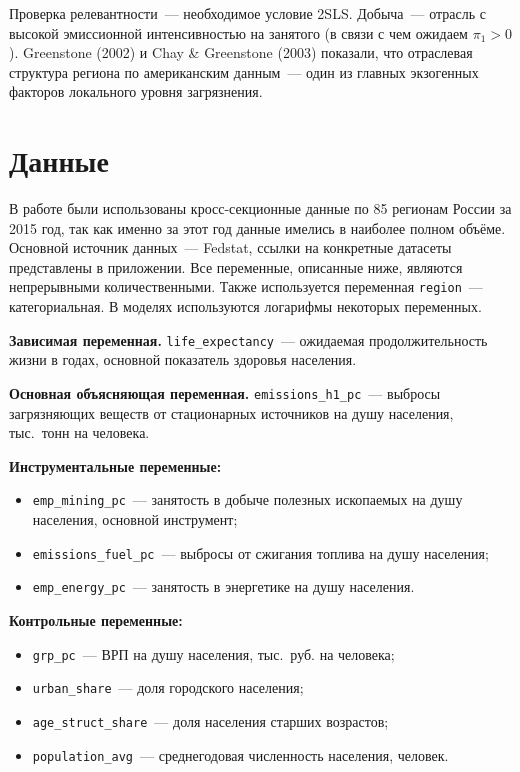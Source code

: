 \documentclass[11pt,a4paper]{article}
\begin{document}
Проверка релевантности~--- необходимое условие 2SLS. Добыча~--- отрасль с высокой эмиссионной интенсивностью на занятого (в связи с чем ожидаем $\pi_1 > 0$). Greenstone (2002) и Chay \& Greenstone (2003) показали, что отраслевая структура региона по американским данным~--- один из главных экзогенных факторов локального уровня загрязнения.

\section*{Данные}

В работе были использованы кросс-секционные данные по 85 регионам России за 2015 год, так как именно за этот год данные имелись в наиболее полном объёме. Основной источник данных~--- Fedstat, ссылки на конкретные датасеты представлены в приложении. Все переменные, описанные ниже, являются непрерывными количественными. Также используется переменная \texttt{region}~--- категориальная. В моделях используются логарифмы некоторых переменных.

\textbf{Зависимая переменная.} \texttt{life\_expectancy}~--- ожидаемая продолжительность жизни в годах, основной показатель здоровья населения.

\textbf{Основная объясняющая переменная.} \texttt{emissions\_h1\_pc}~--- выбросы загрязняющих веществ от стационарных источников на душу населения, тыс.~тонн на человека.

\textbf{Инструментальные переменные:}
\begin{itemize}
  \item \texttt{emp\_mining\_pc}~--- занятость в добыче полезных ископаемых на душу населения, основной инструмент;
  \item \texttt{emissions\_fuel\_pc}~--- выбросы от сжигания топлива на душу населения;
  \item \texttt{emp\_energy\_pc}~--- занятость в энергетике на душу населения.
\end{itemize}

\textbf{Контрольные переменные:}
\begin{itemize}
  \item \texttt{grp\_pc}~--- ВРП на душу населения, тыс.~руб. на человека;
  \item \texttt{urban\_share}~--- доля городского населения;
  \item \texttt{age\_struct\_share}~--- доля населения старших возрастов;
  \item \texttt{population\_avg}~--- среднегодовая численность населения, человек.
\end{itemize}
\end{document}
